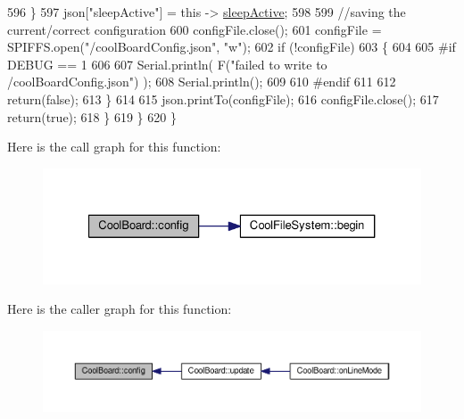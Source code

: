 \begin{DoxyCode}
596             \}
597             json[\textcolor{stringliteral}{"sleepActive"}] = \textcolor{keyword}{this} -> \hyperlink{classCoolBoard_a0a51b2287139f66c738101fb53139230}{sleepActive};
598 
599             \textcolor{comment}{//saving the current/correct configuration}
600             configFile.close();
601             configFile = SPIFFS.open(\textcolor{stringliteral}{"/coolBoardConfig.json"}, \textcolor{stringliteral}{"w"});
602             \textcolor{keywordflow}{if} (!configFile)
603             \{
604             
605 \textcolor{preprocessor}{            #if DEBUG == 1}
606 
607                 Serial.println( F(\textcolor{stringliteral}{"failed to write to /coolBoardConfig.json"}) );
608                 Serial.println();
609             
610 \textcolor{preprocessor}{            #endif}
611  
612                 \textcolor{keywordflow}{return}(\textcolor{keyword}{false});
613             \}
614 
615             json.printTo(configFile);
616             configFile.close();
617             \textcolor{keywordflow}{return}(\textcolor{keyword}{true});
618         \}
619     \}
620 \}
\end{DoxyCode}
Here is the call graph for this function\+:\nopagebreak
\begin{figure}[H]
\begin{center}
\leavevmode
\includegraphics[width=327pt]{classCoolBoard_a583a874c09c07e70a6eb9229fc4beddb_cgraph}
\end{center}
\end{figure}
Here is the caller graph for this function\+:\nopagebreak
\begin{figure}[H]
\begin{center}
\leavevmode
\includegraphics[width=350pt]{classCoolBoard_a583a874c09c07e70a6eb9229fc4beddb_icgraph}
\end{center}
\end{figure}
\mbox{\label{classCoolBoard_a519de78b807f8ec6463ff484eb925918}} 
